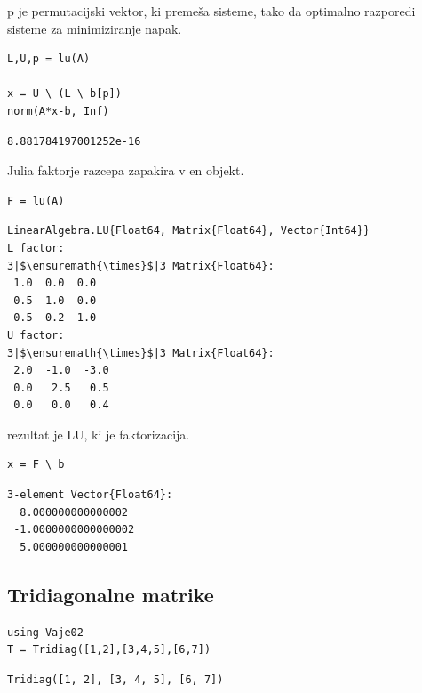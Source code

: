 \documentclass[12pt,a4paper]{article}
\begin{document}
p je permutacijski vektor, ki premeša sisteme, tako da optimalno razporedi sisteme za minimiziranje napak.


\begin{verbatim}
L,U,p = lu(A)

x = U \ (L \ b[p])
norm(A*x-b, Inf)
\end{verbatim}
\begin{verbatim}
8.881784197001252e-16
\end{verbatim}

Julia faktorje razcepa zapakira v en objekt.


\begin{verbatim}
F = lu(A)
\end{verbatim}
\begin{verbatim}
LinearAlgebra.LU{Float64, Matrix{Float64}, Vector{Int64}}
L factor:
3|$\ensuremath{\times}$|3 Matrix{Float64}:
 1.0  0.0  0.0
 0.5  1.0  0.0
 0.5  0.2  1.0
U factor:
3|$\ensuremath{\times}$|3 Matrix{Float64}:
 2.0  -1.0  -3.0
 0.0   2.5   0.5
 0.0   0.0   0.4
\end{verbatim}

rezultat je LU, ki je faktorizacija.


\begin{verbatim}
x = F \ b
\end{verbatim}
\begin{verbatim}
3-element Vector{Float64}:
  8.000000000000002
 -1.0000000000000002
  5.000000000000001
\end{verbatim}

\subsection{Tridiagonalne matrike}

\begin{verbatim}
using Vaje02
T = Tridiag([1,2],[3,4,5],[6,7])
\end{verbatim}
\begin{verbatim}
Tridiag([1, 2], [3, 4, 5], [6, 7])
\end{verbatim}
\end{document}
